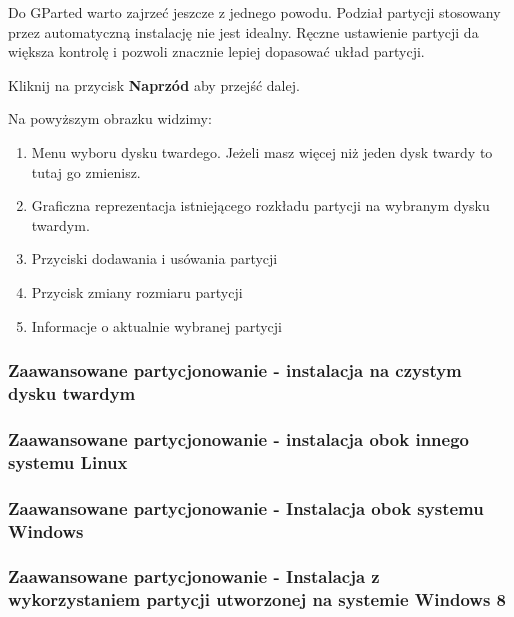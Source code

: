 Do GParted warto zajrzeć jeszcze z jednego powodu. Podział partycji stosowany przez automatyczną instalację nie jest idealny. Ręczne ustawienie partycji da większa kontrolę i pozwoli znacznie lepiej dopasować układ partycji. 
\begin{flushright}
Kliknij na przycisk \textbf{Naprzód} aby przejść dalej.\\
\end{flushright}
\clearpage
Na powyższym obrazku widzimy:
\begin{enumerate}
\item Menu wyboru dysku twardego. Jeżeli masz więcej niż jeden dysk twardy to tutaj go zmienisz.
\item Graficzna reprezentacja istniejącego rozkładu partycji na wybranym dysku twardym.
\item Przyciski dodawania i usówania partycji
\item Przycisk zmiany rozmiaru partycji
\item Informacje o aktualnie wybranej partycji
\end{enumerate}

\clearpage

\subsubsection{Zaawansowane partycjonowanie - instalacja na czystym dysku twardym}

\subsubsection{Zaawansowane partycjonowanie - instalacja obok innego systemu Linux}

\subsubsection{Zaawansowane partycjonowanie - Instalacja obok systemu Windows}

\subsubsection{Zaawansowane partycjonowanie - Instalacja z wykorzystaniem partycji utworzonej na systemie Windows 8}